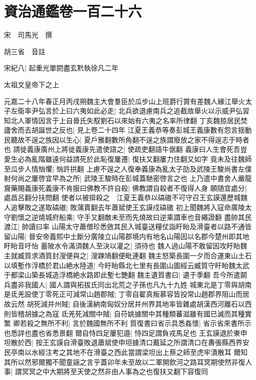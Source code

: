 \section{資治通鑑卷一百二十六}
宋　司馬光　撰

胡三省　音註

宋紀八|{
	起重光單閼盡玄黓執徐凡二年}


太祖文皇帝下之上

元嘉二十八年春正月丙戌朔魏主大會羣臣於瓜步山上班爵行賞有差魏人緣江舉火太子左衛率尹弘言於上曰六夷如此必走|{
	北兵欲退慮南兵之追截故舉火以示威尹弘習知北人軍情因言于上自晉氏失馭劉石以來始有六夷之名率所律翻}
丁亥魏掠居民焚廬舍而去胡誕世之反也|{
	見上卷二十四年}
江夏王義恭等奏彭城王義康數有怨言揺動民聽故不逞之族因以生心|{
	夏戶雅翻數所角翻不逞之族謂廢放之家不得逞志于時者也}
請徙義康廣州上將徙義康先遣使語之|{
	使疏吏翻語牛倨翻}
義康曰人生會死吾豈愛生必為亂階雖遠何益請死於此恥復屢遷|{
	復扶又翻屢力住翻又如字}
竟未及往魏師至瓜步人情忷懼|{
	忷許拱翻}
上慮不逞之人復奉義康為亂太子劭及武陵王駿尚書左僕射何尚之屢啓宜早為之所|{
	武陵王駿時在彭城蓋馳密啓言之也}
上乃遣中書舍人嚴龍齎藥賜義康死義康不肯服曰佛教不許自殺|{
	佛教謂自殺者不復得人身}
願随宜處分|{
	處昌呂翻分扶問翻}
使者以被揜殺之　江夏王義恭以碻磝不可守召王玄謨還歷城魏人追擊敗之遂取碻磝|{
	敗蒲賣翻去年蕭斌使王玄謨戍碻磝}
初上聞魏將入寇命廣陵太守劉懷之逆燒城府船乘|{
	守手又翻敵未至而先燒故曰逆乘謂車也音繩證翻}
盡帥其民渡江|{
	帥讀曰率}
山陽太守蕭僧珍悉斂其民入城臺送糧仗詣盱眙及滑臺者以路不通皆留山陽|{
	晉安帝義熙中土斷分廣陵立山陽郡境内有地名山陽因以名郡今楚州即其地盱眙音吁怡}
蓄陂水令滿須魏人至決以灌之|{
	須待也}
魏人過山陽不敢留因攻盱眙魏主就臧質求酒質封溲便與之|{
	溲踈鳩翻便毗連翻}
魏主怒築長圍一夕而合運東山土石以填塹作浮橋於君山絶水陸道|{
	今盱眙縣北七里有長圍山圖經云臧質守盱眙魏太武于都梁山築長城造浮橋絶水路即此塹七艷翻}
魏主遺質書曰|{
	遺于季翻}
吾今所遣鬬兵盡非我國人|{
	國人謂與拓拔氏同出北荒之子孫也凡九十九姓}
城東北是丁零與胡南是氐羌設使丁零死正可減常山趙郡賊|{
	丁零自翟真叛慕容皆投常山趙郡界阻山而居故云然}
胡死減并州賊|{
	自後漢納南匈奴分居并州界其地率皆雜處胡漢西河離石以西則皆稽胡據之為寇}
氐羌死減關中賊|{
	自苻姚據關中其種類蕃滋雖有國已滅而其種實繁}
卿若殺之無所不利|{
	言於魏國無所不利}
質復書曰省示具悉姦懷|{
	省示省來書所示也悉詳也盡也省悉景翻}
爾自恃四足屢犯邉|{
	恃四足謂負戎馬足也}
王玄謨退於東申坦散於西|{
	按王玄謨自滑臺敗退蕭斌使申坦據清口戴延之所謂清口在夀張縣西界安民亭南以水經注考之其地不在滑臺之西此當謂梁坦出上蔡之師至虎牢潰散耳}
爾知其所以然邪爾獨不聞童謡之言乎蓋卯年未至故以二軍開飲河之路耳冥期使然非復人事|{
	謂冥冥之中大期將至天使之然非由人事為之也復扶又翻下容復同}
